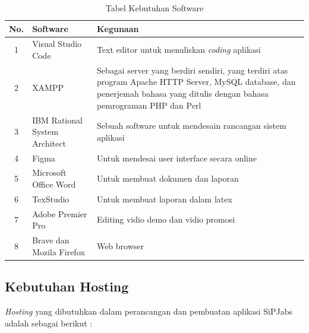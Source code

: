 \begin{table}[H]
	\centering
	\caption{Tabel Kebutuhan Software}
	\begin{tabular}{ | c | l | p{65mm} | }
		\hline
		No. & Software & Kegunaan \\
		\hline
		
		1 & Visual Studio Code & Text editor untuk menuliskan \textit{coding} aplikasi \\
				
		\hline
		
		2 & XAMPP & Sebagai server yang berdiri sendiri, yang terdiri atas program Apache HTTP Server, MySQL database, dan penerjemah bahasa yang ditulis dengan bahasa pemrograman PHP dan Perl \\
		
		\hline
		
		3 & IBM Rational System Architect  & Sebuah software untuk mendesain rancangan sistem aplikasi \\
		
		\hline
		
		4 & Figma & Untuk mendesai user interface secara online \\
		
		
		\hline
		
		5 & Microsoft Office Word & Untuk membuat dokumen dan laporan \\
		
		\hline
		
		6 & TexStudio & Untuk membuat laporan dalam latex \\
		
		\hline
		
		7 & Adobe Premier Pro & Editing vidio demo dan vidio promosi \\
		
		\hline
		
		8 & Brave dan Mozila Firefox & Web browser \\
		
		\hline
	\end{tabular}
\end{table}

\subsection{Kebutuhan Hosting}

\textit{Hosting} yang dibutuhkan dalam perancangan dan pembuatan aplikasi SiPJabs
adalah sebagai berikut :

